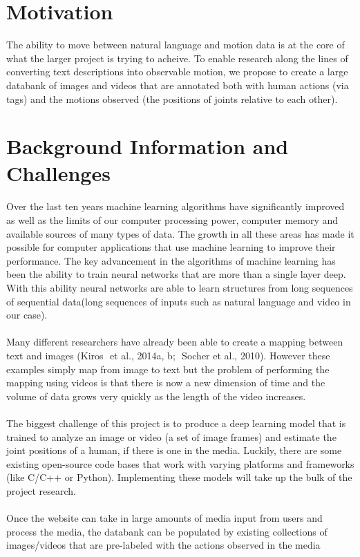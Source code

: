 \documentclass[a4paper, 12pt]{article}
\begin{document}
\section{Motivation} The ability to move between natural language and motion
data is at the core of what the larger project is trying to acheive. To enable
research along the lines of converting text descriptions into observable motion,
we propose to create a large databank of images and videos that are annotated
both with human actions (via tags) and the motions observed (the positions of
joints relative to each other).

\section{Background Information and Challenges} Over the last ten years machine
learning algorithms have significantly improved as well as the limits of our
computer processing power, computer memory and available sources of many types
of data. The growth in all these areas has made it possible for computer
applications that use machine learning to improve their performance. The key
advancement in the algorithms of machine learning has been the ability to train
neural networks that are more than a single layer deep. With this ability neural
networks are able to learn structures from long sequences of sequential
data(long sequences of inputs such as natural language and video in our case). \\ \\
Many different researchers have already been able to create a mapping between
text and images (Kiros ​ et al., 2014a, b; ​ Socher et al., 2010). However these
examples simply map from image to text but the problem of performing the mapping
using videos is that there is now a new dimension of time and the volume of data
grows very quickly as the length of the video increases. \\ \\ The biggest
challenge of this project is to produce a deep learning model that is trained to
analyze an image or video (a set of image frames) and estimate the joint
positions of a human, if there is one in the media. Luckily, there are some
existing open-source code bases that work with varying platforms and frameworks
(like C/C++ or Python). Implementing these models will take up the bulk of the
project research. \\ \\ Once the website can take in large amounts of media
input from users and process the media, the databank can be populated by
existing collections of images/videos that are pre-labeled with the actions
observed in the media
\end{document}
